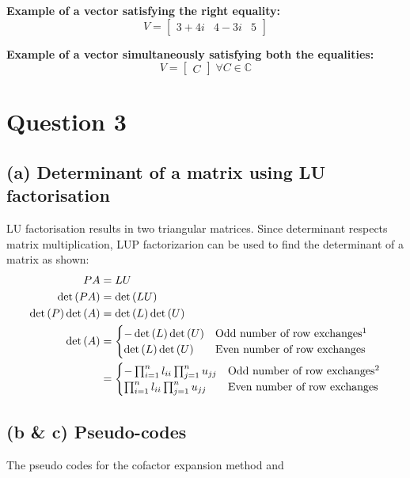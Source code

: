 \documentclass[11pt, oneside]{article}
\begin{document}
  \noindent\textbf{Example of a vector satisfying the right equality:} \begin{equation*}
    V = \begin{bmatrix}
      3 + 4 i & 4 - 3 i & 5
  \end{bmatrix}
  \end{equation*}

  \noindent\textbf{Example of a vector simultaneously satisfying both the equalities:} \begin{equation*}
    V = \begin{bmatrix}
      C
  \end{bmatrix} \; \forall C \in \mathbb{C}
  \end{equation*}
  \vfill

\section*{Question 3}
\subsection*{(a) Determinant of a matrix using LU factorisation}
  LU factorisation results in two triangular matrices. Since determinant respects matrix multiplication, LUP factorizarion can be used to find the determinant of a matrix as shown:
  \begin{align*}
    PA &= LU \\
    \det {(PA)} &= \det {(LU)} \\
    \det{(P)} \det{(A)} &= \det{(L)} \det{(U)} \\
    \det{(A)} &=  \begin{cases}
                - \det{(L)} \det{(U)} & \text{Odd number of row exchanges}\footnotemark \\
                \det{(L)} \det{(U)} & \text{Even number of row exchanges} \\
              \end{cases} \\
              &= \begin{cases}
                - \prod_{i=1}^n l_{ii} \prod_{j=1}^n u_{jj} & \text{Odd number of row exchanges}\footnotemark \\
                \prod_{i=1}^n l_{ii} \prod_{j=1}^n u_{jj} & \text{Even number of row exchanges} \\
              \end{cases}
  \end{align*}
  \addtocounter{footnote}{-1}

\subsection*{(b \& c) Pseudo-codes}
The pseudo codes for the cofactor expansion method and
\newpage


\end{document}
